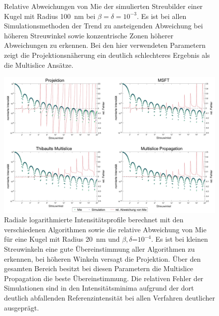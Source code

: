 \begin{figure}
\begin{subfigure}[b]{0.48\textwidth}
	\end{subfigure}
	\caption[Relativer Fehler der Simulationen]{Relative Abweichungen von Mie der simulierten Streubilder einer Kugel mit Radius \SI{100}{nm} bei $\beta=\delta=10^{-3}$. Es ist bei allen Simulationsmethoden der Trend zu ansteigenden Abweichung bei höheren Streuwinkel sowie konzentrische Zonen höherer Abweichungen zu erkennen. Bei den hier verwendeten Parametern zeigt die Projektionsnäherung ein deutlich schlechteres Ergebnis als die Multislice Ansätze.}
	\label{fig:relerror}
\end{figure}

\clearpage
\begin{figure} %
	\centering
	\includegraphics[width=1\textwidth]{images/fig_sim_profile.pdf}
	\captionsetup{width=0.95\textwidth}
	\caption[Radiale Profile]{Radiale logarithmierte Intensitätsprofile berechnet mit den verschiedenen Algorithmen sowie die relative Abweichung von Mie für eine Kugel mit Radius \SI{20}{nm} und $\beta,\delta$=$10^{-4}$. Es ist bei kleinen Streuwinkeln eine gute Übereinstimmung aller Algorithmen zu erkennen, bei höheren Winkeln versagt die Projektion. Über den gesamten Bereich besitzt bei diesen Parametern die Multislice Propagation die beste Übereinstimmung. Die relativen Fehler der Simulationen sind in den Intensitätsminima aufgrund der dort deutlich abfallenden Referenzintensität bei allen Verfahren deutlicher ausgeprägt.}
	\label{fig:profil}
\end{figure}
\clearpage

